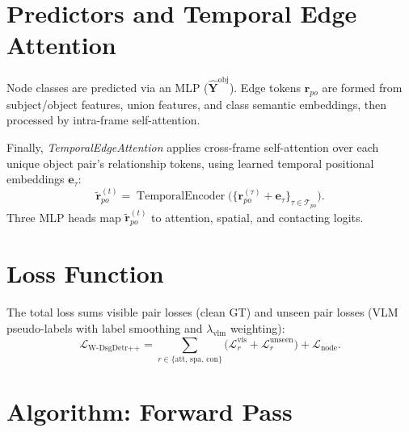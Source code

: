 \documentclass{article}
\newcommand{\op}[1]{\operatorname{#1}}
\newcommand{\mat}[1]{\bm{#1}}
\begin{document}
\section{Predictors and Temporal Edge Attention}
\label{sec:predictors}

Node classes are predicted via an MLP ($\hat{\mat{Y}}^{\text{obj}}$). Edge tokens $\mat{r}_{po}$ are formed from subject/object features, union features, and class semantic embeddings, then processed by intra-frame self-attention.

Finally, \emph{TemporalEdgeAttention} applies cross-frame self-attention over each unique object pair's relationship tokens, using learned temporal positional embeddings $\mat{e}_\tau$:
\begin{equation}
    \tilde{\mat{r}}_{po}^{(t)} = \op{TemporalEncoder}\bigl(\{{\mat{r}}_{po}^{(\tau)} + \mat{e}_{\tau}\}_{\tau \in \mathcal{T}_{po}}\bigr).
    \label{eq:tea}
\end{equation}
Three MLP heads map $\tilde{\mat{r}}_{po}^{(t)}$ to attention, spatial, and contacting logits.


\section{Loss Function}
\label{sec:loss}

The total loss sums visible pair losses (clean GT) and unseen pair losses (VLM pseudo-labels with label smoothing and $\lambda_{\text{vlm}}$ weighting):
\begin{equation}
    \mathcal{L}_{\text{W-DsgDetr++}} = \sum_{r \in \{\text{att, spa, con}\}} \bigl(\mathcal{L}_{r}^{\text{vis}} + \mathcal{L}_{r}^{\text{unseen}}\bigr) + \mathcal{L}_{\text{node}}.
    \label{eq:loss}
\end{equation}


\section{Algorithm: Forward Pass}
\label{sec:algorithm}
\end{document}
